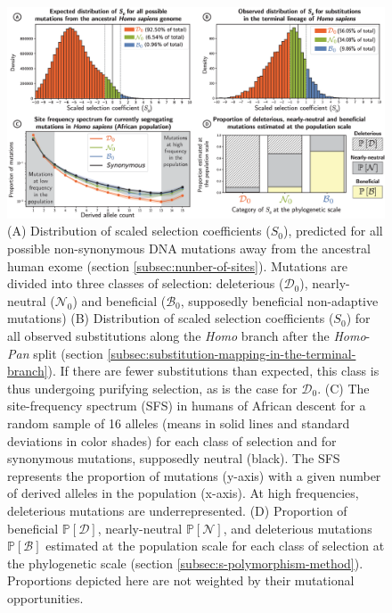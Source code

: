 \documentclass{article}
\newcommand{\proba}{\mathbb{P}}
\newcommand{\Sphy}{S_{0}}
\newcommand{\SphyDel}{\mathcal{D}_0}
\newcommand{\SphyNeu}{\mathcal{N}_0}
\newcommand{\SphyBen}{\mathcal{B}_0}
\newcommand{\SpopDel}{\mathcal{D}}
\newcommand{\SpopNeu}{\mathcal{N}}
\newcommand{\SpopBen}{\mathcal{B}}
\newcommand{\ProbaPopDel}{\proba [ \SpopDel]}
\newcommand{\ProbaPopNeu}{\proba [ \SpopNeu ]}
\newcommand{\ProbaPopBen}{\proba [ \SpopBen ]}
\begin{document}
    \begin{figure}[!h]
        \centering
        \includegraphics[width=\textwidth, page=1] {figure3.eps}
        \caption{
            (A) Distribution of scaled selection coefficients ($\Sphy$), predicted for all possible non-synonymous DNA mutations away from the ancestral human exome (section \ref{subsec:nunber-of-sites}).
            Mutations are divided into three classes of selection: deleterious ($\SphyDel$), nearly-neutral ($\SphyNeu$) and beneficial ($\SphyBen$, supposedly beneficial non-adaptive mutations)
            (B) Distribution of scaled selection coefficients ($\Sphy$) for all observed substitutions along the \textit{Homo} branch after the \textit{Homo}-\textit{Pan} split (section \ref{subsec:substitution-mapping-in-the-terminal-branch}).
            If there are fewer substitutions than expected, this class is thus undergoing purifying selection, as is the case for $\SphyDel$.
            (C) The site-frequency spectrum (SFS) in humans of African descent for a random sample of 16 alleles (means in solid lines and standard deviations in color shades) for each class of selection and for synonymous mutations, supposedly neutral (black). The SFS represents the proportion of mutations (y-axis) with a given number of derived alleles in the population (x-axis).
            At high frequencies, deleterious mutations are underrepresented.
            (D) Proportion of beneficial $\ProbaPopDel$, nearly-neutral $\ProbaPopNeu$, and deleterious mutations $\ProbaPopBen$ estimated at the population scale for each class of selection at the phylogenetic scale (section \ref{subsec:s-polymorphism-method}). Proportions depicted here are not weighted by their mutational opportunities.
        }
        \label{fig:homo-afr-results}
    \end{figure}
\end{document}
